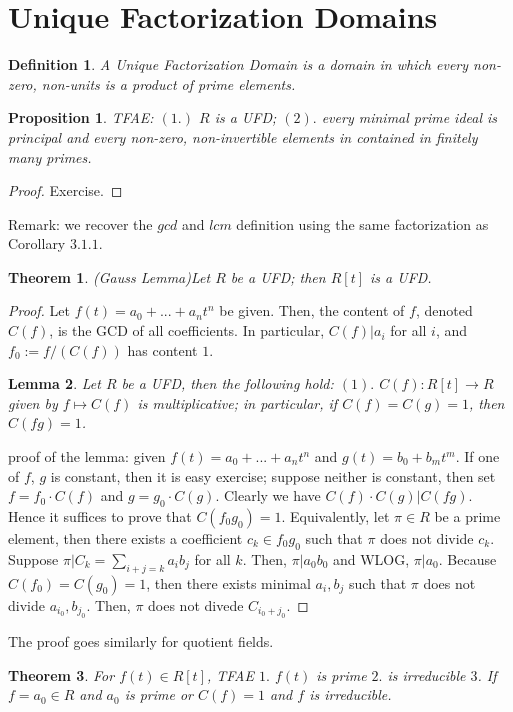 \documentclass{article}
\newtheorem{theorem}{Theorem}[section]
\newtheorem{proposition}{Proposition}[section]
\newtheorem{lemma}[theorem]{Lemma}
\newtheorem{definition}{Definition}[section]
\begin{document}
\section{Unique Factorization Domains}
\begin{definition}
    A Unique Factorization Domain is a domain in which every non-zero, non-units is a product of prime elements. 
\end{definition}
\begin{proposition}
    TFAE: $(1.)$ $R$ is a UFD; $(2).$ every minimal prime ideal is principal and every non-zero, non-invertible elements in contained in finitely many primes. 
\end{proposition}
\begin{proof}
    Exercise. 
\end{proof}
Remark: we recover the $gcd$ and $lcm$ definition using the same factorization as Corollary $3.1.1$.



\begin{theorem}
    (Gauss Lemma)Let $R$ be a UFD; then $R[t]$ is a UFD. 
\end{theorem}
\begin{proof}
    Let $f(t)=a_0+...+a_nt^n$ be given. Then, the content of $f$, denoted $C(f)$, is the GCD of all coefficients. In particular, $C(f)|a_i$ for all $i$, and $f_0:=f/(C(f))$ has content $1$. 
\begin{lemma}
    Let $R$ be a UFD, then the following hold: $(1).$ $C(f): R[t]\to R$ given by $f\mapsto C(f)$ is multiplicative; in particular, if $C(f)=C(g)=1$, then $C(fg)=1$. 
\end{lemma}
proof of the lemma: given $f(t)=a_0+...+a_nt^n$ and $g(t)=b_0+b_mt^m$. If one of $f$, $g$ is constant, then it is easy exercise; suppose neither is constant, then set $f=f_0\cdot C(f)$ and $g=g_0\cdot C(g)$. Clearly we have $C(f)\cdot C(g)| C(fg)$. Hence it suffices to prove that $C(f_0g_0)=1$. Equivalently, let $\pi\in R$ be a prime element, then there exists a coefficient $c_k\in f_0g_0$ such that $\pi$ does not divide $c_k$. Suppose $\pi| C_k=\sum_{i+j=k}a_ib_j$ for all $k$. Then, $\pi|a_0b_0$ and WLOG, $\pi|a_0$. Because $C(f_0)=C(g_0)=1$, then there exists minimal $a_i,b_j$ such that $\pi$ does not divide $a_{i_0},b_{j_0}$. Then, $\pi$ does not divede $C_{i_0+j_0}$.

\end{proof}
The proof goes similarly for quotient fields. 
\begin{theorem}
    For $f(t)\in R[t]$, TFAE
    $1.$ $f(t)$ is prime
    $2.$ is irreducible
    $3$. If $f=a_0\in R$ and $a_0$ is prime or $C(f)=1$ and $f$ is irreducible. 
\end{theorem}
\end{document}
